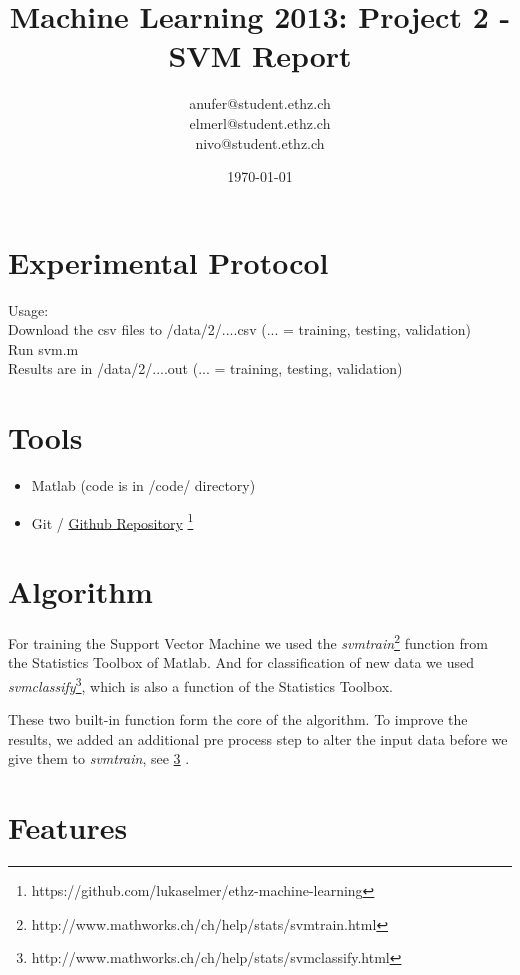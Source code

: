 \documentclass[a4paper, 11pt]{article}
\title{Machine Learning 2013: Project 2 - SVM Report}
\author{anufer@student.ethz.ch\\ elmerl@student.ethz.ch\\ nivo@student.ethz.ch\\}
\date{\today}
\begin{document}
\maketitle

\section*{Experimental Protocol}
Usage:\\
Download the csv files to /data/2/....csv (... = training, testing, validation)\\
Run svm.m \\
Results are in /data/2/....out (... = training, testing, validation)

\section{Tools}

\begin{itemize}
\item Matlab (code is in /code/ directory)
\item Git / \href{https://github.com/lukaselmer/ethz-machine-learning}{Github Repository} \footnote{https://github.com/lukaselmer/ethz-machine-learning}
\end{itemize}

\section{Algorithm}
\label{sec:Algorithm}
For training the Support Vector Machine we used the \textit{svmtrain}\footnote{http://www.mathworks.ch/ch/help/stats/svmtrain.html} function from the Statistics Toolbox of Matlab. And for classification of new data we used \textit{svmclassify}\footnote{http://www.mathworks.ch/ch/help/stats/svmclassify.html}, which is also a function of the Statistics Toolbox.

These two built-in function form the core of the algorithm. To improve the results, we added an additional pre process step to alter the input data before we give them to \textit{svmtrain}, see \ref{sec:Features} .
\section{Features}
\label{sec:Features}
\end{document}
